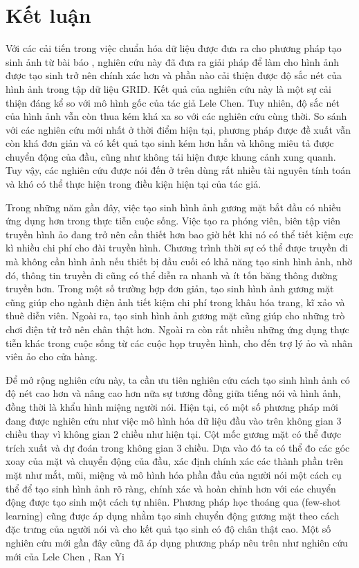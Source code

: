 \chapter{Kết luận}

Với các cải tiến trong việc chuẩn hóa dữ liệu được đưa ra cho phương pháp tạo sinh ảnh từ bài báo \cite{chen2019}, nghiên cứu này đã đưa ra giải pháp để làm cho hình ảnh được tạo sinh trở nên chính xác hơn và phần nào cải thiện được độ sắc nét của hình ảnh trong tập dữ liệu GRID. Kết quả của nghiên cứu này là một sự cải thiện đáng kể so với mô hình gốc của tác giả Lele Chen. Tuy nhiên, độ sắc nét của hình ảnh vẫn còn thua kém khá xa so với các nghiên cứu cùng thời. So sánh với các nghiên cứu mới nhất ở thời điểm hiện tại, phương pháp được đề xuất vẫn còn khá đơn giản và có kết quả tạo sinh kém hơn hẳn và không miêu tả được chuyển động của đầu, cũng như không tái hiện được khung cảnh xung quanh. Tuy vậy, các nghiên cứu được nói đến ở trên dùng rất nhiều tài nguyên tính toán và khó có thể thực hiện trong điều kiện hiện tại của tác giả.

Trong những năm gần đây, việc tạo sinh hình ảnh gương mặt bắt đầu có nhiều ứng dụng hơn trong thực tiễn cuộc sống. Việc tạo ra phóng viên, biên tập viên truyền hình ảo đang trở nên cần thiết hơn bao giờ hết khi nó có thể tiết kiệm cực kì nhiều chi phí cho đài truyền hình. Chương trình thời sự có thể được truyền đi mà không cần hình ảnh nếu thiết bị đầu cuối có khả năng tạo sinh hình ảnh, nhờ đó, thông tin truyền đi cũng có thể diễn ra nhanh và ít tốn băng thông đường truyền hơn. Trong một số trường hợp đơn giản, tạo sinh hình ảnh gương mặt cũng giúp cho ngành điện ảnh tiết kiệm chi phí trong khâu hóa trang, kĩ xảo và thuê diễn viên. Ngoài ra, tạo sinh hình ảnh gương mặt cũng giúp cho những trò chơi điện tử trở nên chân thật hơn. Ngoài ra còn rất nhiều những ứng dụng thực tiễn khác trong cuộc sống từ các cuộc họp truyền hình, cho đến trợ lý ảo và nhân viên ảo cho cửa hàng.

Để mở rộng nghiên cứu này, ta cần ưu tiên nghiên cứu cách tạo sinh hình ảnh có độ nét cao hơn và nâng cao hơn nữa sự tương đồng giữa tiếng nói và hình ảnh, đồng thời là khẩu hình miệng người nói. Hiện tại, có một số phương pháp mới đang được nghiên cứu như việc mô hình hóa dữ liệu đầu vào trên không gian 3 chiều thay vì không gian 2 chiều như hiện tại. Cột mốc gương mặt có thể được trích xuất và dự đoán trong không gian 3 chiều. Dựa vào đó ta có thể đo các góc xoay của mặt và chuyển động của đầu, xác định chính xác các thành phần trên mặt như mắt, mũi, miệng và mô hình hóa phần đầu của người nói một cách cụ thể để tạo sinh hình ảnh rõ ràng, chính xác và hoàn chỉnh hơn với các chuyển động được tạo sinh một cách tự nhiên. Phương pháp học thoáng qua (few-shot learning) cũng được áp dụng nhằm tạo sinh chuyển động gương mặt theo cách đặc trưng của người nói và cho kết quả tạo sinh có độ chân thật cao. Một số nghiên cứu mới gần đây cũng đã áp dụng phương pháp nêu trên như nghiên cứu mới của Lele Chen \cite{chen2020}, Ran Yi \cite{ranyi}
